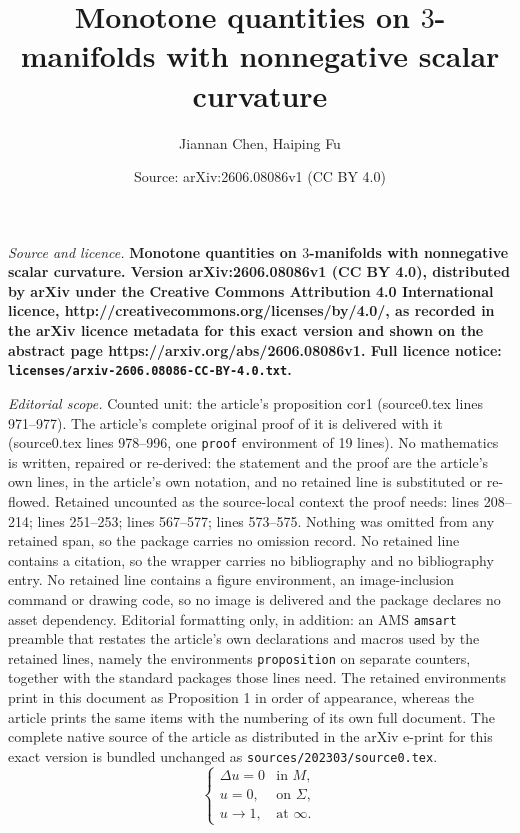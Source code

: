 \documentclass[10pt,a4paper]{amsart}
\title{\bf Monotone quantities on $3$-manifolds with nonnegative scalar curvature}
\author{Jiannan Chen, Haiping Fu}
\date{Source: arXiv:2606.08086v1 (CC BY 4.0)}
\begin{document}
\maketitle

\noindent\emph{Source and licence.} \bf Monotone quantities on $3$-manifolds with nonnegative scalar curvature. Version arXiv:2606.08086v1 (CC BY 4.0), distributed by arXiv under the Creative Commons Attribution 4.0 International licence, http://creativecommons.org/licenses/by/4.0/, as recorded in the arXiv licence metadata for this exact version and shown on the abstract page https://arxiv.org/abs/2606.08086v1. Full licence notice: \texttt{licenses/arxiv-2606.08086-CC-BY-4.0.txt}.\par\smallskip

\noindent\textit{Editorial scope.} Counted unit: the article's proposition cor1 (source0.tex lines 971--977). The article's complete original proof of it is delivered with it (source0.tex lines 978--996, one \texttt{proof} environment of 19 lines). No mathematics is written, repaired or re-derived: the statement and the proof are the article's own lines, in the article's own notation, and no retained line is substituted or re-flowed.  Retained uncounted as the source-local context the proof needs: lines 208--214; lines 251--253; lines 567--577; lines 573--575.  Nothing was omitted from any retained span, so the package carries no omission record.  No retained line contains a citation, so the wrapper carries no bibliography and no bibliography entry.  No retained line contains a figure environment, an image-inclusion command or drawing code, so no image is delivered and the package declares no asset dependency.  Editorial formatting only, in addition: an AMS \texttt{amsart} preamble that restates the article's own declarations and macros used by the retained lines, namely the environments \texttt{proposition} on separate counters, together with the standard packages those lines need.  The retained environments print in this document as Proposition 1 in order of appearance, whereas the article prints the same items with the numbering of its own full document.  The complete native source of the article as distributed in the arXiv e-print for this exact version is bundled unchanged as \texttt{sources/202303/source0.tex}.
\begin{equation}\label{u}
\begin{cases}
\Delta u=0 &\text{in } M,\\
u=0, &\text{on } \Sigma,\\
u\to 1, &\text{at } \infty.
\end{cases}
\end{equation}
\end{document}
